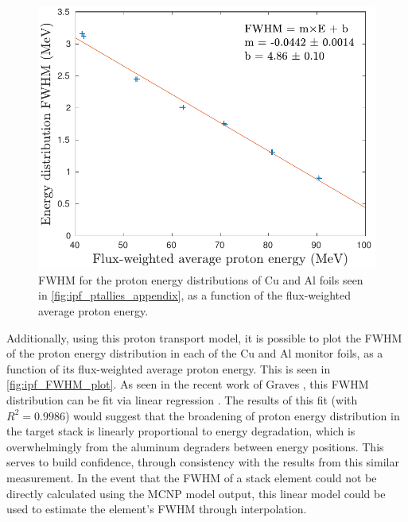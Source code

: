 \begin{figure}
 \centering
 \includegraphics[width=0.5\columnwidth]{./figures/FWHM_plot.pdf}
 \caption{FWHM for the proton energy distributions of Cu and Al foils seen in \autoref{fig:ipf_ptallies_appendix}, as a function of the flux-weighted average proton energy. }
 \label{fig:fe_FWHM_plot}
\end{figure}



Additionally, using this proton transport model, it is possible to plot the FWHM of the proton energy distribution in each of the Cu and Al monitor foils, as a function of its  flux-weighted average proton energy.
This is seen in \autoref{fig:ipf_FWHM_plot}.
As seen in the recent work of Graves \etal, this FWHM distribution can be fit via linear regression \cite{Graves2016}.
The results of this fit (with $R^2=0.9986$) would suggest that the broadening of proton energy distribution in the target stack is linearly proportional to energy degradation, which is overwhelmingly from the aluminum degraders between energy positions.
This serves to build confidence, through consistency with the  results from this similar measurement.
In the event that the FWHM of a stack element could not be directly calculated using the MCNP model output, this linear model could be used to estimate the element's FWHM through interpolation. 



